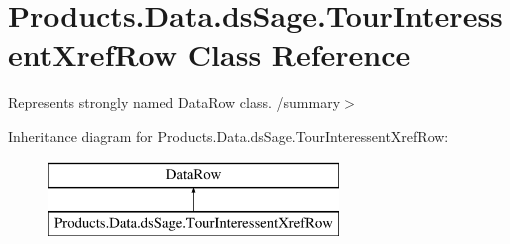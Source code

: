 \hypertarget{class_products_1_1_data_1_1ds_sage_1_1_tour_interessent_xref_row}{}\section{Products.\+Data.\+ds\+Sage.\+Tour\+Interessent\+Xref\+Row Class Reference}
\label{class_products_1_1_data_1_1ds_sage_1_1_tour_interessent_xref_row}


Represents strongly named Data\+Row class. /summary$>$  


Inheritance diagram for Products.\+Data.\+ds\+Sage.\+Tour\+Interessent\+Xref\+Row\+:\begin{figure}[H]
\begin{center}
\leavevmode
\includegraphics[height=2.000000cm]{class_products_1_1_data_1_1ds_sage_1_1_tour_interessent_xref_row}
\end{center}
\end{figure}
